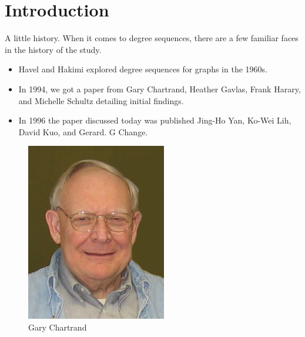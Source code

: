 \section{Introduction}


\begin{frame}{A little history.}
	When it comes to degree sequences, there are a few familiar faces in the history of the study.
		\begin{itemize}
			\item Havel and Hakimi explored degree sequences for graphs in the 1960s.
			\item In 1994, we got a paper from Gary Chartrand, Heather Gavlas, Frank Harary, and Michelle Schultz detailing initial findings.
			\item In 1996 the paper discussed today was published Jing-Ho Yan, Ko-Wei Lih, David Kuo, and Gerard. G Change.
		\end{itemize}
\end{frame}

\begin{frame}
	\begin{figure}
		\centering 
		\includegraphics{GaryChartrand.png}
		\caption[]{Gary Chartrand}
	\end{figure}
\end{frame}



